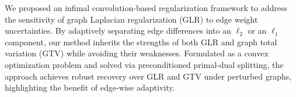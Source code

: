 We proposed an infimal convolution-based regularization framework to address the sensitivity of graph Laplacian regularization (GLR) to edge weight uncertainties. 
By adaptively separating edge differences into an $\ell_{2}$ or an $\ell_1$ component, our method inherits the strengths of both GLR and graph total variation (GTV) while avoiding their weaknesses. 
Formulated as a convex optimization problem and solved via preconditioned primal-dual splitting, the approach achieves robust recovery over GLR and GTV under perturbed graphs, highlighting the benefit of edge-wise adaptivity. 